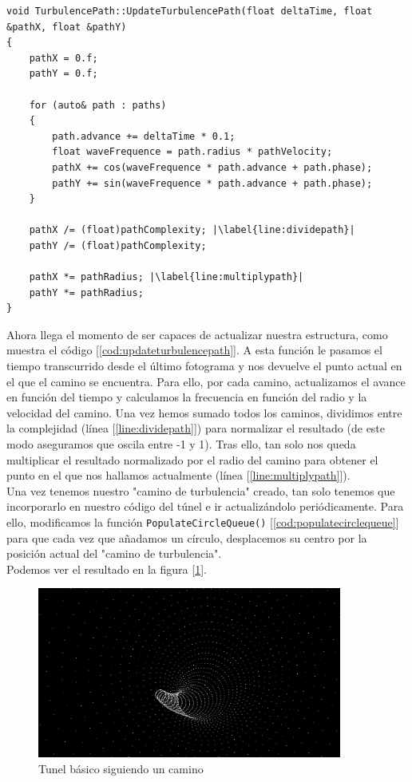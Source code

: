 \begin{lstlisting}[style=C-color, caption={Actualización de un camino de turbulencia},label=cod:updateturbulencepath,escapechar=|]
void TurbulencePath::UpdateTurbulencePath(float deltaTime, float &pathX, float &pathY)
{
    pathX = 0.f;
    pathY = 0.f;

    for (auto& path : paths)
    {
        path.advance += deltaTime * 0.1;
        float waveFrequence = path.radius * pathVelocity;
        pathX += cos(waveFrequence * path.advance + path.phase);
        pathY += sin(waveFrequence * path.advance + path.phase);
    }

    pathX /= (float)pathComplexity; |\label{line:dividepath}|
    pathY /= (float)pathComplexity;

    pathX *= pathRadius; |\label{line:multiplypath}|
    pathY *= pathRadius;
}
\end{lstlisting}

Ahora llega el momento de ser capaces de actualizar nuestra estructura, como muestra el código [\ref{cod:updateturbulencepath}]. A esta función le pasamos el tiempo transcurrido desde el último fotograma y nos devuelve el punto actual en el que el camino se encuentra. Para ello, por cada camino, actualizamos el avance en función del tiempo y calculamos la frecuencia en función del radio y la velocidad del camino. Una vez hemos sumado todos los caminos, dividimos entre la complejidad (línea [\ref{line:dividepath}]) para normalizar el resultado (de este modo aseguramos que oscila entre -1 y 1). Tras ello, tan solo nos queda multiplicar el resultado normalizado por el radio del camino para obtener el punto en el que nos hallamos actualmente (línea [\ref{line:multiplypath}]).\\

Una vez tenemos nuestro "camino de turbulencia" creado, tan solo tenemos que incorporarlo en nuestro código del túnel e ir actualizándolo periódicamente. Para ello, modificamos la función \lstinline{PopulateCircleQueue()} [\ref{cod:populatecirclequeue}] para que cada vez que añadamos un círculo, desplacemos su centro por la posición actual del "camino de turbulencia".\\

Podemos ver el resultado en la figura [\ref{fig:tunnelwithturbulence}].

\begin{figure}[h]
	\centering
	\includegraphics[width=10cm]{archivos/tunnelwithturbulence}
	\caption{Tunel básico siguiendo un camino}
	\label{fig:tunnelwithturbulence}
\end{figure}

